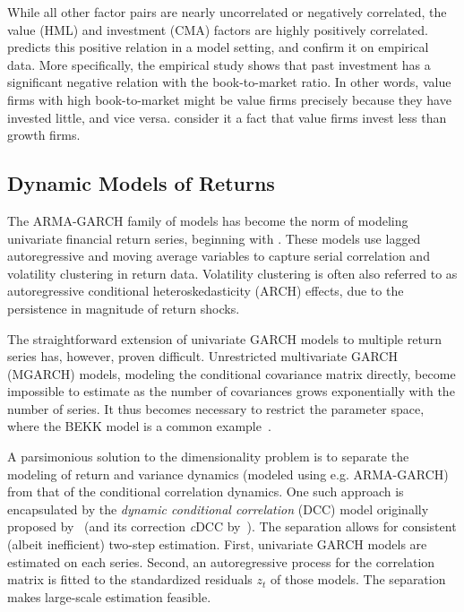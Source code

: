 While all other factor pairs are nearly uncorrelated or negatively correlated, the value (HML) and investment (CMA) factors are highly positively correlated. \textcite{Zhang2005} predicts this positive relation in a model setting, and \textcite{AndersonGarciaFeijoo2006} confirm it on empirical data. More specifically, the empirical study shows that past investment has a significant negative relation with the book-to-market ratio. In other words, value firms with high book-to-market might be value firms precisely because they have invested little, and vice versa. \textcite{FF2015} consider it a fact that value firms invest less than growth firms.

\subsection{Dynamic Models of Returns}

The ARMA-GARCH family of models has become the norm of modeling univariate financial return series, beginning with \textcite{Bollerslev1986}. These models use lagged autoregressive and moving average variables to capture serial correlation and volatility clustering in return data. Volatility clustering is often also referred to as autoregressive conditional heteroskedasticity (ARCH) effects, due to the persistence in magnitude of return shocks.

The straightforward extension of univariate GARCH models to multiple return series has, however, proven difficult. Unrestricted multivariate GARCH (MGARCH) models, modeling the conditional covariance matrix directly, become impossible to estimate as the number of covariances grows exponentially with the number of series. It thus becomes necessary to restrict the parameter space, where the BEKK model is a common example~\autocite{BEKKModel}.

A parsimonious solution to the dimensionality problem is to separate the modeling of return and variance dynamics (modeled using e.g. ARMA-GARCH) from that of the conditional correlation dynamics. One such approach is encapsulated by the \emph{dynamic conditional correlation} (DCC) model originally proposed by~\autocite{Engle2002} (and its correction \emph{c}DCC by~\autocite{Aielli2013}). The separation allows for consistent (albeit inefficient) two-step estimation. First, univariate GARCH models are estimated on each series. Second, an autoregressive process for the correlation matrix is fitted to the standardized residuals ${z_t}$ of those models. The separation makes large-scale estimation feasible.

